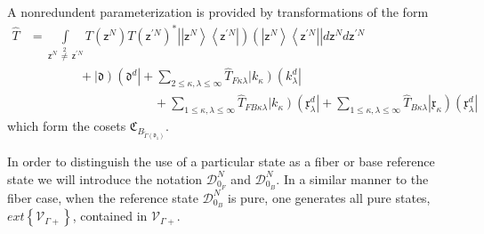 \documentclass[aps,preprint]{revtex4}%
\begin{document}
A nonredundent parameterization is provided by transformations of the form
\begin{align}
\hat{T}  &  =%
{\displaystyle\int\limits_{\mathsf{z}^{N}\,\overset{2}{\neq}\,\mathsf{z}%
^{\prime N}}}
T\left(  \mathsf{z}^{N}\right)  T\left(  \mathsf{z}^{\prime N}\right)  ^{\ast
}\left\vert \left\vert \mathsf{z}^{N}\right\rangle \left\langle \mathsf{z}%
^{\prime N}\right\vert \right)  \left(  \left\vert \mathsf{z}^{N}\right\rangle
\left\langle \mathsf{z}^{\prime N}\right\vert \right\vert d\mathsf{z}%
^{N}d\mathsf{z}^{\prime N}\nonumber\\
&  \qquad\qquad+\left\vert \mathfrak{d}\right)  \left(  \mathfrak{d}%
^{d}\right\vert +%
{\displaystyle\sum\limits_{2\leq\kappa,\lambda\leq\infty}}
\hat{T}_{F\kappa\lambda}\left\vert k_{\kappa}\right)  \left(  k_{\lambda}%
^{d}\right\vert \nonumber\\
&  \qquad\qquad\qquad\qquad\qquad+%
{\displaystyle\sum\limits_{1\leq\kappa,\lambda\leq\infty}}
\hat{T}_{FB\kappa\lambda}\left\vert k_{\kappa}\right)  \left(  \mathfrak{x}%
_{\lambda}^{d}\right\vert +%
{\displaystyle\sum\limits_{1\leq\kappa,\lambda\leq\infty}}
\hat{T}_{B\kappa\lambda}\left\vert \mathfrak{x}_{\kappa}\right)  \left(
\mathfrak{x}_{\lambda}^{d}\right\vert
\end{align}
which form the cosets $\mathfrak{C}_{B_{\tilde{\Gamma}\left(  \mathfrak{d}%
_{1}\right)  }}$.

In order to distinguish the use of a particular state as a fiber or base
reference state we will introduce the notation $\mathcal{D}_{0_{F}}^{N}$ and
$\mathcal{D}_{0_{B}}^{N}$. In a similar manner to the fiber case, when the
reference state $\mathcal{D}_{0_{B}}^{N}$ is pure, one generates all pure
states, $ext\left\{  \mathcal{V}_{\Gamma+}\right\}  $, contained in
$\mathcal{V}_{\Gamma+}$.
\end{document}
